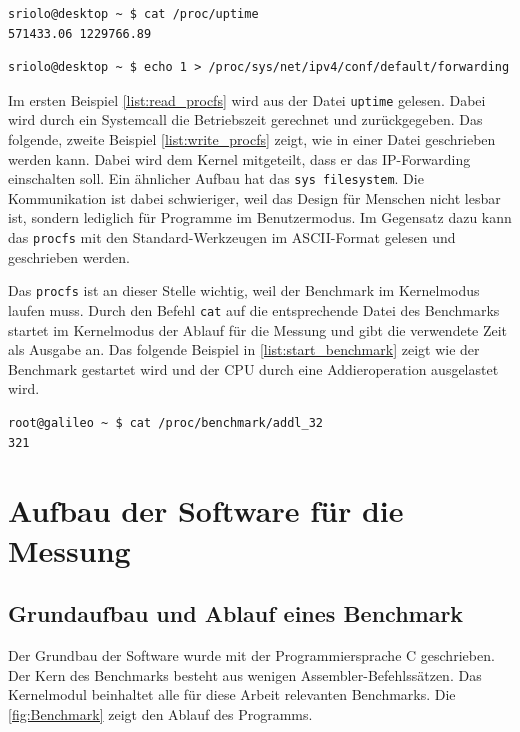 \lstset{language=bash}
\begin{lstlisting}[label={list:read_procfs},caption={Lesen im procfs}]
sriolo@desktop ~ $ cat /proc/uptime 
571433.06 1229766.89
\end{lstlisting}
\begin{lstlisting}[label={list:write_procfs},caption={Schreiben im procfs}]
sriolo@desktop ~ $ echo 1 > /proc/sys/net/ipv4/conf/default/forwarding
\end{lstlisting}

Im ersten Beispiel \autoref{list:read_procfs} wird aus der Datei \texttt{uptime} gelesen. Dabei wird durch ein Systemcall die Betriebszeit gerechnet und zurückgegeben. Das folgende, zweite Beispiel \autoref{list:write_procfs} zeigt, wie in einer Datei geschrieben werden kann. Dabei wird dem Kernel mitgeteilt, dass er das IP-Forwarding einschalten soll. Ein ähnlicher Aufbau hat das \texttt{sys filesystem}. Die Kommunikation ist dabei schwieriger, weil das Design für Menschen nicht lesbar ist, sondern lediglich für Programme im Benutzermodus. Im Gegensatz dazu kann das \texttt{procfs} mit den Standard-Werkzeugen im ASCII-Format gelesen und geschrieben werden.
\par
Das \texttt{procfs} ist an dieser Stelle wichtig, weil der Benchmark im Kernelmodus laufen muss. Durch den Befehl \texttt{cat} auf die entsprechende Datei des Benchmarks startet im Kernelmodus der Ablauf für die Messung und gibt die verwendete Zeit als Ausgabe an. Das folgende Beispiel in \autoref{list:start_benchmark} zeigt wie der Benchmark gestartet wird und der CPU durch eine Addieroperation ausgelastet wird.

\begin{lstlisting}[label={list:start_benchmark},caption={Starten des Benchmark}]
root@galileo ~ $ cat /proc/benchmark/addl_32
321
\end{lstlisting}


\section{Aufbau der Software für die Messung}


\subsection{Grundaufbau und Ablauf eines Benchmark}
Der Grundbau der Software wurde mit der Programmiersprache C geschrieben. Der Kern des Benchmarks besteht aus wenigen Assembler-Befehlssätzen. Das Kernelmodul beinhaltet alle für diese Arbeit relevanten Benchmarks. Die \autoref{fig:Benchmark} zeigt den Ablauf des Programms.

